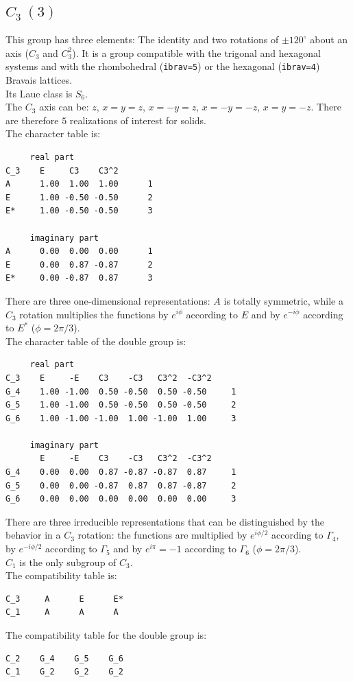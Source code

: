 \documentclass[12pt,a4paper]{article}
\begin{document}
\subsection{\color{web-blue}$C_3\ (3)$}
This group has three elements: The identity and two rotations of $\pm120^\circ$ 
about an axis ($C_3$ and $C_3^2$).
It is a group compatible with the trigonal and hexagonal systems and with the
rhombohedral (\texttt{ibrav=5}) or the hexagonal (\texttt{ibrav=4}) Bravais 
lattices. \\
Its Laue class is $S_6$. \\
The $C_3$ axis can be: $z$, $x=y=z$, $x=-y=z$, $x=-y=-z$, $x=y=-z$.
There are therefore $5$ realizations of interest for solids. \\
The character table is:
\begin{verbatim}
     real part
C_3    E     C3    C3^2
A      1.00  1.00  1.00      1
E      1.00 -0.50 -0.50      2
E*     1.00 -0.50 -0.50      3

     imaginary part
A      0.00  0.00  0.00      1
E      0.00  0.87 -0.87      2
E*     0.00 -0.87  0.87      3 
\end{verbatim}
There are three one-dimensional representations: $A$ is totally symmetric, while
a $C_3$ rotation multiplies the functions by $e^{i\phi}$ according to $E$
and by $e^{-i\phi}$ according to $E^*$ ($\phi=2 \pi / 3$). \\
The character table of the double group is:
\begin{verbatim}
     real part
C_3    E     -E    C3    -C3   C3^2  -C3^2
G_4    1.00 -1.00  0.50 -0.50  0.50 -0.50     1
G_5    1.00 -1.00  0.50 -0.50  0.50 -0.50     2
G_6    1.00 -1.00 -1.00  1.00 -1.00  1.00     3

     imaginary part
       E     -E    C3    -C3   C3^2  -C3^2
G_4    0.00  0.00  0.87 -0.87 -0.87  0.87     1
G_5    0.00  0.00 -0.87  0.87  0.87 -0.87     2
G_6    0.00  0.00  0.00  0.00  0.00  0.00     3
\end{verbatim}
There are three irreducible representations that can be distinguished by the
behavior in a $C_3$ rotation: the functions are multiplied by $e^{i\phi/2}$ according
to $\Gamma_4$, by $e^{-i\phi/2}$ according to $\Gamma_5$ and by $e^{i\pi}=-1$ 
according to $\Gamma_6$ ($\phi=2 \pi / 3$). \\
$C_1$ is the only subgroup of $C_3$. \\
The compatibility table is:
\begin{verbatim}
C_3     A      E      E*  
C_1     A      A      A
\end{verbatim}
The compatibility table for the double group is:
\begin{verbatim}
C_2    G_4    G_5    G_6 
C_1    G_2    G_2    G_2
\end{verbatim}
\end{document}
